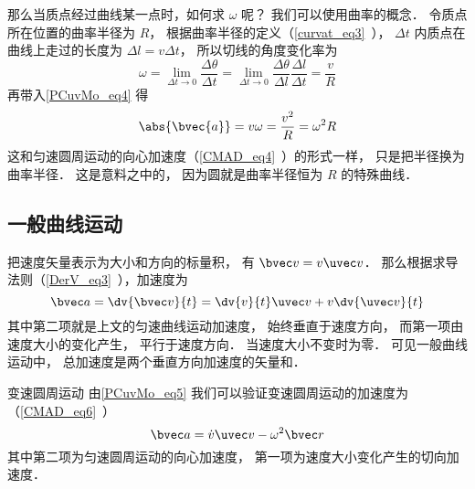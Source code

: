 那么当质点经过曲线某一点时，如何求 $\omega$ 呢？ 我们可以使用曲率的概念． 令质点所在位置的曲率半径为 $R$， 根据曲率半径的定义（\autoref{curvat_eq3}~）， $\Delta t$ 内质点在曲线上走过的长度为 $\Delta l = v \Delta t$， 所以切线的角度变化率为
\begin{equation}
\omega = \lim_{\Delta t\to 0}\frac{\Delta \theta}{\Delta t} = \lim_{\Delta t\to 0}\frac{\Delta \theta}{\Delta l} \frac{\Delta l}{\Delta t} = \frac{v}{R}
\end{equation}
再带入\autoref{PCuvMo_eq4} 得
\begin{equation}\label{PCuvMo_eq3}
\abs{\bvec{a}} = v\omega = \frac{v^2}{R} = \omega^2 R
\end{equation}
这和匀速圆周运动的向心加速度（\autoref{CMAD_eq4}~）的形式一样， 只是把半径换为曲率半径． 这是意料之中的， 因为圆就是曲率半径恒为 $R$ 的特殊曲线．

\subsection{一般曲线运动}
把速度矢量表示为大小和方向的标量积， 有 $\bvec v = v\uvec v$． 那么根据求导法则（\autoref{DerV_eq3}~），加速度为
\begin{equation}\label{PCuvMo_eq5}
\bvec a = \dv{\bvec v}{t} = \dv{v}{t}\uvec v + v\dv{\uvec v}{t}
\end{equation}
其中第二项就是上文的匀速曲线运动加速度， 始终垂直于速度方向， 而第一项由速度大小的变化产生， 平行于速度方向． 当速度大小不变时为零． 可见一般曲线运动中， 总加速度是两个垂直方向加速度的矢量和．

\begin{example}{变速圆周运动}\label{PCuvMo_ex1}
由\autoref{PCuvMo_eq5} 我们可以验证变速圆周运动的加速度为（\autoref{CMAD_eq6}~）
\begin{equation}
\bvec a = \dot v \uvec v - \omega ^2 \bvec r
\end{equation}
其中第二项为匀速圆周运动的向心加速度， 第一项为速度大小变化产生的切向加速度．
\end{example}
